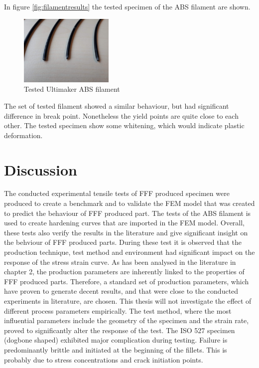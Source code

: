In figure \ref{fig:filamentresults} the tested specimen of the ABS filament are shown.
\begin{figure}[H]
    \centering
    \includegraphics[width=0.40\textwidth]{chapter_5_Experimentaltesting/figures/Imagefilament.jpg}
    \caption{Tested Ultimaker ABS filament}
    \label{fig:filamentspecimen}
\end{figure}
The set of tested filament showed a similar behaviour, but had significant difference in break point. Nonetheless the yield points are quite close to each other. The tested specimen show some whitening, which would indicate plastic deformation.  

\section{Discussion}
The conducted experimental tensile tests of FFF produced specimen were produced to create a benchmark and to validate the FEM model that was created to predict the behaviour of FFF produced part. The tests of the ABS filament is used to create hardening curves that are imported in the FEM model. Overall, these tests also verify the results in the literature and give significant insight on the behviour of FFF produced parts. 
During these test it is observed that the production technique, test method and environment had significant impact on the response of the stress strain curve. As has been analysed in the literature in chapter 2, the production parameters are inherently linked to the properties of FFF produced parts. Therefore, a standard set of production parameters, which have proven to generate decent results, and that were close to the conducted experiments in literature, are chosen. This thesis will not investigate the effect of different process parameters empirically. The test method, where the most influential  parameters include the geometry of the specimen and the strain rate, proved to significantly alter the response of the test. The ISO 527 specimen (dogbone shaped) exhibited major complication during testing. Failure is predominantly brittle and initiated at the beginning of the fillets. This is probably due to stress concentrations and crack initiation points. 

